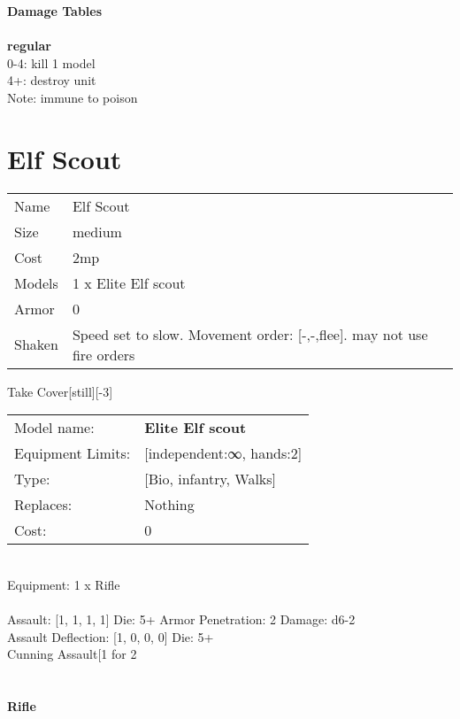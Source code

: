 {\bf Damage Tables} \\
\ \\ {\bf regular } \\
0-4: kill 1 model \\
4+: destroy unit \\
Note: immune to poison \\










\pagebreak\pagebreak

\section{ Elf Scout }

\begin{tabular}{ll}
  Name & Elf Scout \\
  Size & medium\\
  Cost & 2mp\\
  Models & 1 x Elite Elf scout\\
  Armor & 0\\
  Shaken & Speed set to slow. Movement order: [-,-,flee]. may not use fire orders\\
\end{tabular}

\noindent Take Cover[still][-3]\\ 


\noindent
\begin{tabular}{ll}
Model name: &{\bf Elite Elf scout } \\
Equipment Limits: &[independent:∞, hands:2] \\
Type: &[Bio, infantry, Walks] \\
Replaces: &Nothing \\
Cost: & 0\\
\end{tabular}
\ \\
Equipment: 1 x Rifle \\
\ \\
Assault: [1, 1, 1, 1] Die: 5+ Armor Penetration: 2 Damage: d6-2 \\
Assault Deflection: [1, 0, 0, 0] Die: 5+\\
\indent Cunning Assault[1 for 2\\ 
 
\ \\

\ \\
{\bf Rifle } \\



